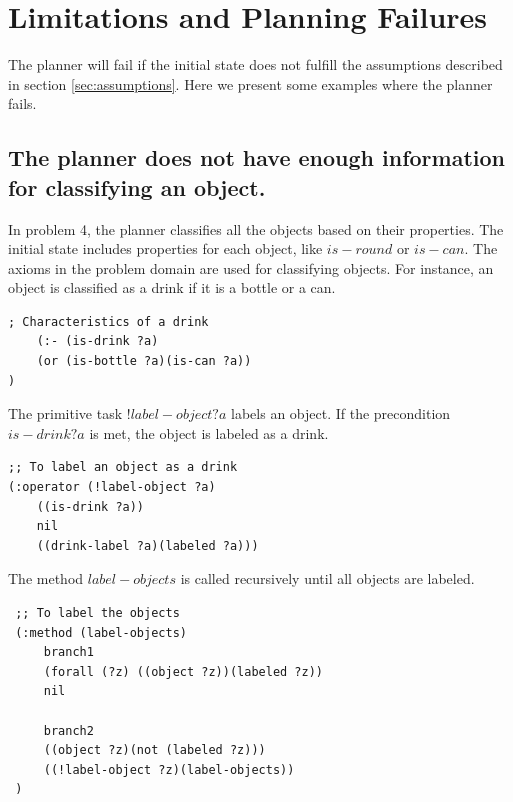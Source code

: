 \documentclass[paper=a4, fontsize=11pt]{scrartcl}
\begin{document}
	\newpage

	\section{Limitations and Planning Failures} \label{sec:limitations}

	The planner will fail if the initial state does not fulfill the assumptions described in section \ref{sec:assumptions}. Here we present some examples where the planner fails.

	\subsection{The planner does not have enough information for classifying an object.}


	In problem 4, the planner classifies all the objects based on their properties. The initial state includes properties for each object, like $is-round$ or $is-can$. The axioms in the problem domain are used for classifying objects. For instance, an object is classified as a drink if it is a bottle or a can. \\

	\begin{lstlisting}
; Characteristics of a drink
	(:- (is-drink ?a)
	(or (is-bottle ?a)(is-can ?a))
)
	\end{lstlisting}

	\vspace{5mm}

	The primitive task $!label-object ?a$ labels an object. If the precondition $is-drink ?a$ is met, the object is labeled as a drink. \\

	\begin{lstlisting}
;; To label an object as a drink
(:operator (!label-object ?a)
	((is-drink ?a))
	nil
	((drink-label ?a)(labeled ?a)))
	\end{lstlisting}

	\vspace{5mm}

	The method $label-objects$ is called recursively until all objects are labeled. \\

	\begin{lstlisting}
 ;; To label the objects
 (:method (label-objects)
	 branch1
	 (forall (?z) ((object ?z))(labeled ?z))
	 nil

	 branch2
	 ((object ?z)(not (labeled ?z)))
	 ((!label-object ?z)(label-objects))
 )
	\end{lstlisting}
\end{document}
